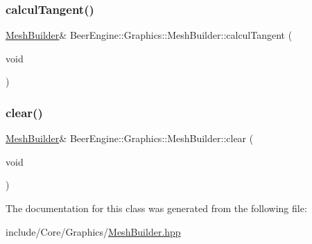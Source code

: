 \mbox{\label{class_beer_engine_1_1_graphics_1_1_mesh_builder_a433beadaa7c9ed25dc913e40a99da421}} 
\subsubsection{\texorpdfstring{calcul\+Tangent()}{calculTangent()}}
{\footnotesize\ttfamily \mbox{\hyperlink{class_beer_engine_1_1_graphics_1_1_mesh_builder}{Mesh\+Builder}}\& Beer\+Engine\+::\+Graphics\+::\+Mesh\+Builder\+::calcul\+Tangent (\begin{DoxyParamCaption}\item[{void}]{ }\end{DoxyParamCaption})}

\mbox{\label{class_beer_engine_1_1_graphics_1_1_mesh_builder_abeb4d8dbeb9096e1fa2c746856356709}} 
\subsubsection{\texorpdfstring{clear()}{clear()}}
{\footnotesize\ttfamily \mbox{\hyperlink{class_beer_engine_1_1_graphics_1_1_mesh_builder}{Mesh\+Builder}}\& Beer\+Engine\+::\+Graphics\+::\+Mesh\+Builder\+::clear (\begin{DoxyParamCaption}\item[{void}]{ }\end{DoxyParamCaption})}



The documentation for this class was generated from the following file\+:\begin{DoxyCompactItemize}
\item 
include/\+Core/\+Graphics/\mbox{\hyperlink{_mesh_builder_8hpp}{Mesh\+Builder.\+hpp}}\end{DoxyCompactItemize}
